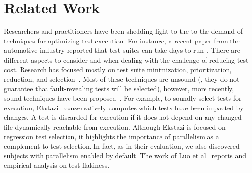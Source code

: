 \section{Related Work}
\label{sec:related}
Researchers and practitioners have been shedding light to the to the
demand of techniques for optimizing test execution. For instance, a
recent paper from the automotive industry reported that test suites
can take days to run~\cite{artl-etal-icst2015}.  There are different
aspects to consider and when dealing with the challenge of reducing
test cost. 
Research has focused mostly on test suite minimization,
prioritization, reduction, and selection~\cite{yoo-harman-stvr2012}.
Most of these techniques are unsound (\ie{}, they do not guarantee
that fault-revealing tests will be selected), however, more recently,
sound techniques have been
proposed~\cite{gligoric-etal-issta2015,soetens-etal-2016}.  For
example, to soundly select tests for execution,
Ekstazi~\cite{ekstazi-web,gligoric-etal-issta2015} conservatively
computes which tests have been impacted by changes.  A test is
discarded for execution if it does not depend on any changed file
dynamically reachable from execution. Although Ekstazi is focused on
regression test selection, it highlights the importance of parallelism
as a complement to test selection. In fact, as in their evaluation, we
also discovered subjects with parallelism enabled by default.
The work of Luo et al~\cite{luo-etal-fse2014} reports and empirical
analysis on test flakiness. 
